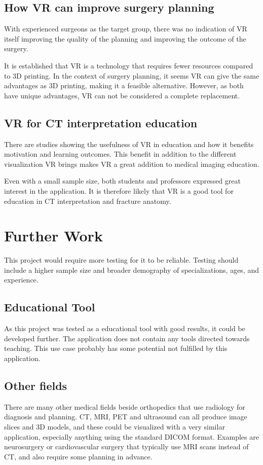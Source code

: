 \documentclass[a4paper]{report}
\begin{document}
\section{How VR can improve surgery planning}

With experienced surgeons as the target group, there was no indication of VR itself improving the quality of the planning and improving the outcome of the surgery.

It is established that VR is a technology that requires fewer resources compared to 3D printing. In the context of surgery planning, it seems VR can give the same advantages as 3D printing, making it a feasible alternative. However, as both have unique advantages, VR can not be considered a complete replacement.

\section{VR for CT interpretation education}
There are studies showing the usefulness of VR in education and how it benefits motivation and learning outcomes. This benefit in addition to the different visualization VR brings makes VR a great addition to medical imaging education.

Even with a small sample size, both students and professors expressed great interest in the application. It is therefore likely that VR is a good tool for education in CT interpretation and fracture anatomy.



\chapter{Further Work}
This project would require more testing for it to be reliable. Testing should include a higher sample size and broader demography of specializations, ages, and experience.

\section{Educational Tool}
As this project was tested as a educational tool with good results, it could be developed further. The application does not contain any tools directed towards teaching. This use case probably has some potential not fulfilled by this application.

\section{Other fields}
There are many other medical fields beside orthopedics that use radiology for diagnosis and planning.
CT, MRI, PET and ultrasound can all produce image slices and 3D models, and these could be visualized with a very similar application, especially anything using the standard DICOM format.
Examples are neurosurgery or cardiovascular surgery that typically use MRI scans instead of CT, and also require some planning in advance.
\end{document}
